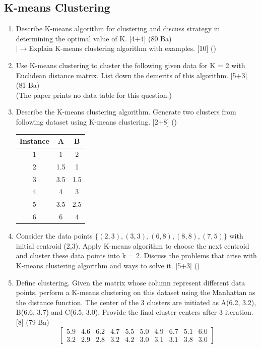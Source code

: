 \documentclass[12pt]{article}
\newcommand{\lb}{\\$\left|\rightarrow\right.$}
\begin{document}
  \subsection{K-means Clustering}
    \begin{enumerate}[topsep=0pt, noitemsep]
      \item Describe K-means algorithm for clustering and discuss strategy in determining the optimal value of K. \hfill [4+4] (80 Ba)
        \lb Explain K-means clustering algorithm with examples. \hfill [10] ()

      \item Use K-means clustering to cluster the following given data for K = 2 with Euclidean distance matrix. List down the demerits of this algorithm. \hfill [5+3] (81 Ba)\\
        (The paper prints no data table for this question.)

      \item Describe the K-means clustering algorithm. Generate two clusters from following dataset using K-means clustering. \hfill [2+8] ()\\
        \small
        \begin{tabular}{|c|c|c|}
          \hline
          Instance & A & B \\ \hline
          1 & 1 & 2 \\ \hline
          2 & 1.5 & 1 \\ \hline
          3 & 3.5 & 1.5 \\ \hline
          4 & 4 & 3 \\ \hline
          5 & 3.5 & 2.5 \\ \hline
          6 & 6 & 4 \\ \hline
        \end{tabular}
        \normalsize

      \item Consider the data points $\{(2,3), (3,3), (6,8), (8,8), (7,5)\}$ with initial centroid (2,3). Apply K-means algorithm to choose the next centroid and cluster these data points into k = 2. Discuss the problems that arise with K-means clustering algorithm and ways to solve it. \hfill [5+3] ()

      \item Define clustering. Given the matrix whose column represent different data points, perform a K-means clustering on this dataset using the Manhattan as the distance function. The center of the 3 clusters are initiated as A(6.2, 3.2), B(6.6, 3.7) and C(6.5, 3.0). Provide the final cluster centers after 3 iteration. \hfill [8] (79 Ba)
        \[ \begin{bmatrix}
          5.9 & 4.6 & 6.2 & 4.7 & 5.5 & 5.0 & 4.9 & 6.7 & 5.1 & 6.0 \\
          3.2 & 2.9 & 2.8 & 3.2 & 4.2 & 3.0 & 3.1 & 3.1 & 3.8 & 3.0
        \end{bmatrix} \]


\end{enumerate}
\end{document}

